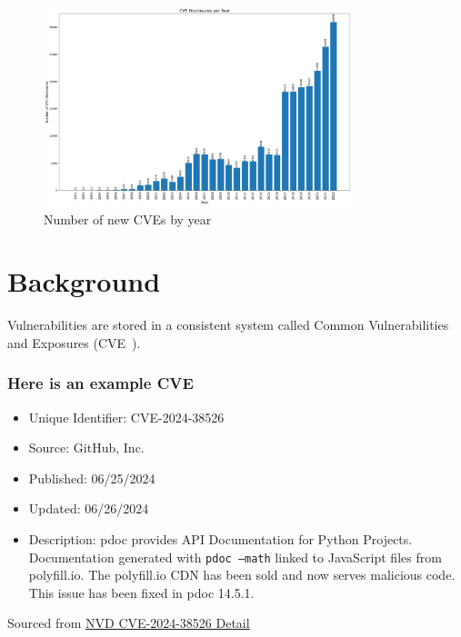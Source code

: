 \documentclass[12pt]{article}
\begin{document}
\begin{figure}[ht] \centering
	\includegraphics[width=0.8\textwidth]{figures/cves_per_year.pdf}
	\caption{\label{fig:cves_per_year}Number of new CVEs by year}
\end{figure}


\section{Background}

Vulnerabilities are stored in a consistent system called Common Vulnerabilities and
Exposures (CVE~\cite{CVE}).

\subsubsection*{Here is an example CVE}
\begin{itemize}

	\item   Unique Identifier: CVE-2024-38526

	\item   Source: GitHub, Inc.

	\item   Published: 06/25/2024

	\item   Updated: 06/26/2024

	\item   Description: pdoc provides API Documentation for Python Projects. Documentation
	      generated with \texttt{pdoc --math} linked to JavaScript files from polyfill.io. The polyfill.io
	      CDN has been sold and now serves malicious code. This issue has been fixed in pdoc 14.5.1.

\end{itemize}

{\footnotesize Sourced from \href{https://nvd.nist.gov/vuln/detail/CVE-2024-38526}{NVD CVE-2024-38526
	Detail} \cite{polyfill}} \\
\bigskip
\end{document}
